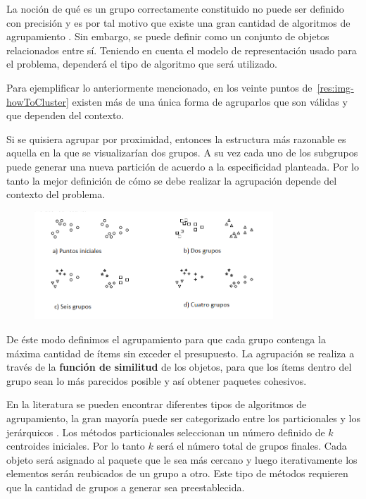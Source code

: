 La noción de qué es un grupo correctamente constituido no puede ser definido con precisión y es por tal motivo que existe una gran cantidad de algoritmos de agrupamiento \cite{Estivill-Castro:2002:WSM:568574.568575}. Sin embargo, se puede definir como un conjunto de objetos relacionados entre sí. Teniendo en cuenta el modelo de representación usado para el problema, dependerá el tipo de algoritmo que será utilizado.

Para ejemplificar lo anteriormente mencionado, en los veinte puntos de~\autoref{res:img-howToCluster} existen más de una única forma de agruparlos que son válidas y que dependen del contexto. 

Si se quisiera agrupar por proximidad, entonces la estructura más razonable es aquella en la que se visualizarían dos grupos. A su vez cada uno de los subgrupos puede generar una nueva partición de acuerdo a la especificidad planteada. Por lo tanto la mejor definición de cómo se debe realizar la agrupación depende del contexto del problema.

\begin{figure}[H]
  \centering
   \includegraphics[width=0.8\textwidth]{img/howToCluster.png}
   \caption{}
   \label{res:img-howToCluster}
\end{figure}

De éste modo definimos el agrupamiento para que cada grupo contenga la máxima cantidad de ítems sin exceder el presupuesto. La agrupación se realiza a través de la \textbf{función de similitud} de los objetos, para que los ítems dentro del grupo sean lo más parecidos posible y así obtener paquetes cohesivos.

En la literatura se pueden encontrar diferentes tipos de algoritmos de agrupamiento, la gran mayoría puede ser categorizado entre los particionales y los jerárquicos \cite{opac-b1087461}. Los métodos particionales seleccionan un número definido de $k$ centroides iniciales. Por lo tanto $k$ será el número total de grupos finales. Cada objeto será asignado al paquete que le sea más cercano y luego iterativamente los elementos serán reubicados de un grupo a otro. Este tipo de métodos requieren que la cantidad de grupos a generar sea preestablecida. 

